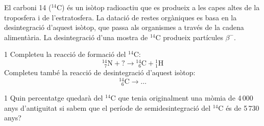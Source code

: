 El carboni 14 ($^{14}\mathrm{C}$) és un isòtop radioactiu que es produeix a les capes altes de la troposfera i de l'estratosfera. La datació de restes orgàniques es basa en la desintegració d'aquest isòtop, que passa als organismes a través de la cadena alimentària. La desintegració d'una mostra de $^{14}\mathrm{C}$ produeix partícules $\beta^-$.

\begin{apartat}{1}
Completeu la reacció de formació del $^{14}\mathrm{C}$:
\[ {}^{14}_{\phantom{1}7}\mathrm{N} + \mathord{?} \rightarrow {}^{14}_{\phantom{1}6}\mathrm{C} + {}^{1}_{1}\mathrm{H} \]
Completeu també la reacció de desintegració d'aquest isòtop:
\[ {}^{14}_{\phantom{1}6}\mathrm{C} \rightarrow \ldots \]
\end{apartat}

\begin{apartat}{1}
Quin percentatge quedarà del $^{14}\mathrm{C}$ que tenia originalment una mòmia de 4\,000 anys d'antiguitat si sabem que el període de semidesintegració del $^{14}\mathrm{C}$ és de 5\,730 anys?
\end{apartat}
